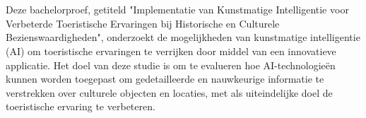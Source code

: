 
%
%
%
%
%

%



\chapter*{}

Deze bachelorproef, getiteld "Implementatie van Kunstmatige Intelligentie voor Verbeterde Toeristische Ervaringen bij Historische en Culturele Bezienswaardigheden", onderzoekt de mogelijkheden van kunstmatige intelligentie (AI) om toeristische ervaringen te verrijken door middel van een innovatieve applicatie. Het doel van deze studie is om te evalueren hoe AI-technologieën kunnen worden toegepast om gedetailleerde en nauwkeurige informatie te verstrekken over culturele objecten en locaties, met als uiteindelijke doel de toeristische ervaring te verbeteren.


